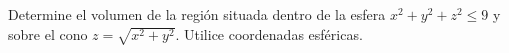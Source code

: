 Determine el volumen de la región situada dentro de la esfera $x^2+y^2+z^2\leq9$ y sobre el cono $z=\sqrt{x^2+y^2}$. Utilice coordenadas esféricas.
